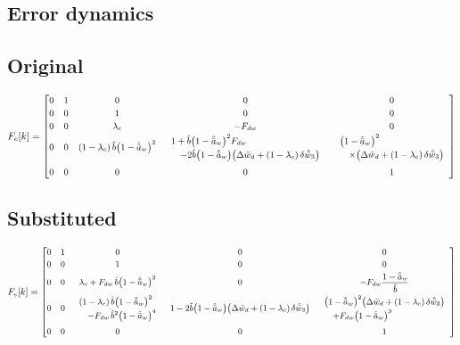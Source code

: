 \documentclass[11pt,a4paper,fontset=none]{ctexart}
\newcommand{\ba}{\bar{a}}
\newcommand{\bw}{\bar{w}}
\newcommand{\ah}{\hat{\ba}_w}
\newcommand{\bh}{\hat{b}}
\begin{document}
\begin{landscape}
\thispagestyle{empty}
\section{Error dynamics}

\subsection*{Original}

\begin{align*}
F_e[k] = {\small\begin{bmatrix}
0 & 1 & 0 & 0 & 0 \\[2pt]
0 & 0 & 1 & 0 & 0 \\[2pt]
0 & 0 & \lambda_c & -F_{dw} & 0 \\[2pt]
0 & 0 & (1-\lambda_c)\,\bh\bigl(1-\ah\bigr)^{2} &
  \begin{array}{l} 1 + \bh\bigl(1-\ah\bigr)^{2}F_{dw} \\[2pt] \quad - 2\bh\bigl(1-\ah\bigr)\bigl(\Delta\bw_d + (1-\lambda_c)\,\delta\hat{\bw}_3\bigr) \end{array} &
  \begin{array}{l} \bigl(1-\ah\bigr)^{2} \\[2pt] \quad \times\bigl(\Delta\bw_d + (1-\lambda_c)\,\delta\hat{\bw}_3\bigr) \end{array} \\[14pt]
0 & 0 & 0 & 0 & 1
\end{bmatrix}}
\end{align*}

\subsection*{Substituted}

\begin{align*}
F_e[k] = {\small\begin{bmatrix}
0 & 1 & 0 & 0 & 0 \\[2pt]
0 & 0 & 1 & 0 & 0 \\[2pt]
0 & 0 & \lambda_c + F_{dw}\,\bh\bigl(1-\ah\bigr)^{2} & 0 & -F_{dw}\dfrac{1-\ah}{\bh} \\[8pt]
0 & 0 &
  \begin{array}{l} (1-\lambda_c)\,\bh\bigl(1-\ah\bigr)^{2} \\[2pt] \quad - F_{dw}\,\bh^{2}\bigl(1-\ah\bigr)^{4} \end{array} &
  1 - 2\bh\bigl(1-\ah\bigr)\bigl(\Delta\bw_d + (1-\lambda_c)\,\delta\hat{\bw}_3\bigr) &
  \begin{array}{l} \bigl(1-\ah\bigr)^{2}\bigl(\Delta\bw_d + (1-\lambda_c)\,\delta\hat{\bw}_3\bigr) \\[2pt] \quad + F_{dw}\bigl(1-\ah\bigr)^{3} \end{array} \\[14pt]
0 & 0 & 0 & 0 & 1
\end{bmatrix}}
\end{align*}


\end{landscape}
\end{document}
